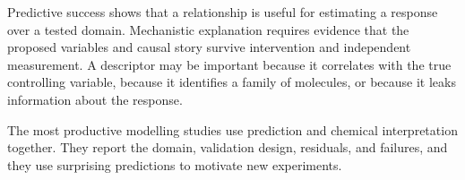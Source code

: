 Predictive success shows that a relationship is useful for estimating a response over a tested domain.
Mechanistic explanation requires evidence that the proposed variables and causal story survive intervention and independent measurement.
A descriptor may be important because it correlates with the true controlling variable, because it identifies a family of molecules, or because it leaks information about the response.


The most productive modelling studies use prediction and chemical interpretation together.
They report the domain, validation design, residuals, and failures, and they use surprising predictions to motivate new experiments.